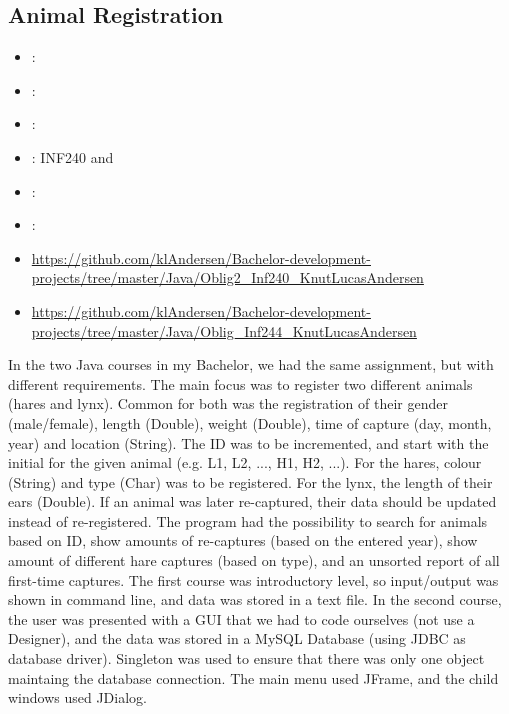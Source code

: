 \label{sec:section4}

\subsection{Animal Registration}
\label{sec:animal_registration}
\begin{itemize} 
	\item {}: 
	\item {}: 
	\item {}: 
	\item {}: INF240 and  
	\item {}: 
	\item {}: 
	\item {} \url{https://github.com/klAndersen/Bachelor-development-projects/tree/master/Java/Oblig2_Inf240_KnutLucasAndersen}
	\item {} \url{https://github.com/klAndersen/Bachelor-development-projects/tree/master/Java/Oblig_Inf244_KnutLucasAndersen}
\end{itemize} 
In the two Java courses in my Bachelor, we had the same assignment, but with different requirements. 
The main focus was to register two different animals (hares and lynx). 
Common for both was the registration of their gender (male/female), length (Double), weight (Double), time of capture (day, month, year) and location (String). 
The ID was to be incremented, and start with the initial for the given animal (e.g. L1, L2, ..., H1, H2, ...). 
For the hares, colour (String) and type (Char) was to be registered. 
For the lynx, the length of their ears (Double).
\vspace{0.5em}\newline
If an animal was later re-captured, their data should be updated instead of re-registered. 
The program had the possibility to search for animals based on ID, show amounts of re-captures (based on the entered year), 
show amount of different hare captures (based on type), and an unsorted report of all first-time captures.
\vspace{0.5em}\newline
The first course was introductory level, so input/output was shown in command line, and data was stored in a text file. 
In the second course, the user was presented with a GUI that we had to code ourselves (not use a Designer), and the data was stored in a MySQL Database 
(using JDBC as database driver). 
Singleton was used to ensure that there was only one object maintaing the database connection. 
The main menu used JFrame, and the child windows used JDialog.

